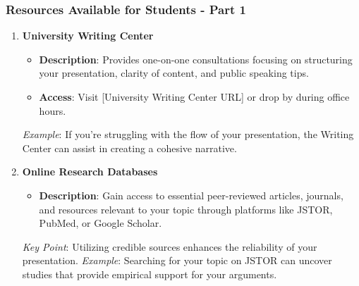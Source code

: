\documentclass[aspectratio=169]{beamer}
\begin{document}
\begin{frame}[fragile]
    \frametitle{Resources Available for Students - Part 1}
    \begin{enumerate}
        \item \textbf{University Writing Center}
        \begin{itemize}
            \item \textbf{Description}: Provides one-on-one consultations focusing on structuring your presentation, clarity of content, and public speaking tips.
            \item \textbf{Access}: Visit [University Writing Center URL] or drop by during office hours.
        \end{itemize}
        \pause
        \textit{Example}: If you're struggling with the flow of your presentation, the Writing Center can assist in creating a cohesive narrative.
        
        \item \textbf{Online Research Databases}
        \begin{itemize}
            \item \textbf{Description}: Gain access to essential peer-reviewed articles, journals, and resources relevant to your topic through platforms like JSTOR, PubMed, or Google Scholar.
        \end{itemize}
        \pause
        \textit{Key Point}: Utilizing credible sources enhances the reliability of your presentation.
        \pause
        \textit{Example}: Searching for your topic on JSTOR can uncover studies that provide empirical support for your arguments.
    \end{enumerate}
\end{frame}
\end{document}
